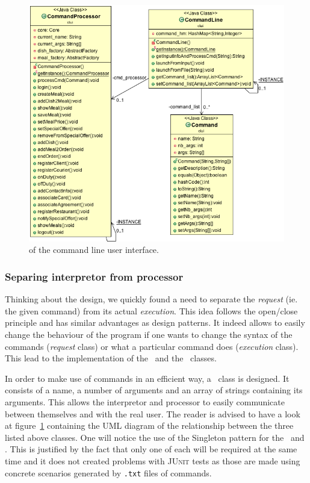 \begin{figure}
  \begin{center}
    \includegraphics[scale=0.5]{./img/CLUI.png}
    \end{center}
  \caption{\umld of the command line user interface.}
  \label{fig:clui_uml}
\end{figure}

\subsubsection{Separing interpretor from processor} %
\label{sub:separing_command_getter_and_command_processor}

Thinking about the design, we quickly found a need to separate
the \emph{request} (ie. the given command) from its actual \emph{execution}.
This idea follows the open/close principle and has similar advantages
as design patterns.
It indeed allows to easily change the behaviour of the program if
one wants to change the syntax of the commands (\emph{request} class)
or what a particular command does (\emph{execution} class).
This lead to the implementation of the \CommandLine~and
the \CommandProcessor~classes.

In order to make use of commands in an efficient way,
a \Command~class is designed.
It consists of a name, a number of arguments and an array
of strings containing its arguments.
This allows the interpretor and processor to easily
communicate between themselves and with the real user.
The reader is advised to have a look at figure~\ref{fig:clui_uml}
containing the UML diagram of the relationship between
the three listed above classes.
One will notice the use of the Singleton pattern for
the \CommandProcessor~and \CommandLine.
This is justified by the fact that only one
of each will be required at the same time
and it does not created problems with \textsc{JUnit} tests
as those are made using concrete scenarios
generated by \texttt{.txt} files of commands.

